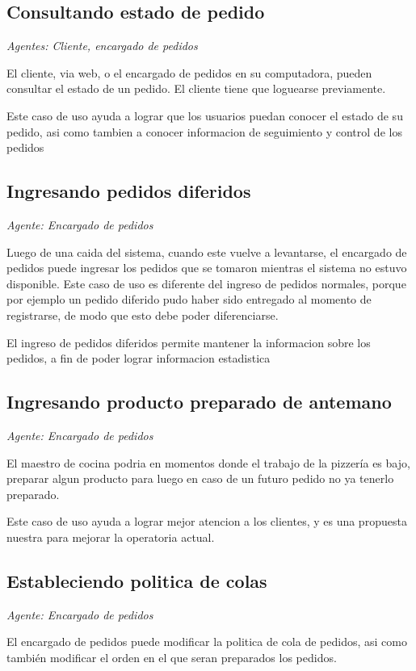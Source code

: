 \subsection{Consultando estado de pedido}

\textit{Agentes: Cliente, encargado de pedidos}

El cliente, via web, o el encargado de pedidos en su computadora, pueden consultar el estado 
de un pedido. El cliente tiene que loguearse previamente.

Este caso de uso ayuda a lograr que los usuarios puedan conocer el estado de su pedido, asi 
como tambien a conocer informacion de seguimiento y control de los pedidos

\subsection{Ingresando pedidos diferidos}

\textit{Agente: Encargado de pedidos}

Luego de una caida del sistema, cuando este vuelve a levantarse, el encargado de pedidos 
puede ingresar los pedidos que se tomaron mientras el sistema no estuvo disponible. Este 
caso de uso es diferente del ingreso de pedidos normales, porque por ejemplo un pedido 
diferido pudo haber sido entregado al momento de registrarse, de modo que esto debe poder 
diferenciarse.

El ingreso de pedidos diferidos permite mantener la informacion sobre los pedidos, a fin de 
poder lograr informacion estadistica

\subsection{Ingresando producto preparado de antemano}
\textit{Agente: Encargado de pedidos}

El maestro de cocina podria en momentos donde el trabajo de la pizzería es bajo, preparar 
algun producto para luego en caso de un futuro pedido no ya tenerlo preparado.

Este caso de uso ayuda a lograr mejor atencion a los clientes, y es una propuesta nuestra 
para mejorar la operatoria actual.

\subsection{Estableciendo politica de colas}
\textit{Agente: Encargado de pedidos}

El encargado de pedidos puede modificar la politica de cola de pedidos, asi como también 
modificar el orden en el que seran preparados los pedidos.

